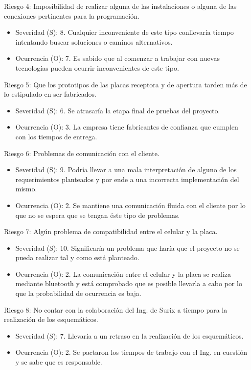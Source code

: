 \documentclass[11pt]{charter}
\begin{document}
Riesgo 4: Imposibilidad de realizar alguna de las instalaciones o alguna de las conexiones pertinentes para la programación.
\begin{itemize}
\item Severidad (S): 8. Cualquier inconveniente de este tipo conllevaría tiempo intentando buscar soluciones o caminos alternativos.
\item Ocurrencia (O): 7. Es sabido que al comenzar a trabajar con nuevas tecnologías pueden ocurrir inconvenientes de este tipo.
\end{itemize}

Riesgo 5: Que los prototipos de las placas receptora y de apertura tarden más de lo estipulado en ser fabricados.
\begin{itemize}
\item Severidad (S): 6. Se atrasaría la etapa final de pruebas del proyecto.
\item Ocurrencia (O): 3. La empresa tiene fabricantes de confianza que cumplen con los tiempos de entrega.
\end{itemize}

Riesgo 6: Problemas de comunicación con el cliente.
\begin{itemize}
\item Severidad (S): 9. Podría llevar a una mala interpretación de alguno de los requerimientos planteados y por ende a una incorrecta implementación del mismo.
\item Ocurrencia (O): 2. Se mantiene una comunicación fluida con el cliente por lo que no se espera que se tengan éste tipo de problemas.
\end{itemize}

Riesgo 7: Algún problema de compatibilidad entre el celular y la placa.
\begin{itemize}
\item Severidad (S): 10. Significaría un problema que haría que el proyecto no se pueda realizar tal y como está planteado.
\item Ocurrencia (O): 2. La comunicación entre el celular y la placa se realiza mediante bluetooth y está comprobado que es posible llevarla a cabo por lo que la probabilidad de ocurrencia es baja.
\end{itemize}

Riesgo 8: No contar con la colaboración del Ing. de Surix a tiempo para la realización de los esquemáticos.
\begin{itemize}
\item Severidad (S): 7. Llevaría a un retraso en la realización de los esquemáticos.
\item Ocurrencia (O): 2. Se pactaron los tiempos de trabajo con el Ing. en cuestión y se sabe que es responsable. 
\end{itemize}
\end{document}

